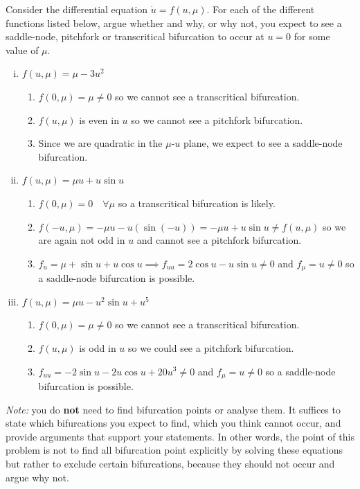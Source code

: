 \documentclass[12pt]{article}
\begin{document}
Consider the differential equation $\dot{u}=f(u,\mu)$. For each of the different functions listed below, argue whether and why, or why not, you expect to see a saddle-node, pitchfork or transcritical bifurcation to occur at $u=0$ for some value of $\mu$.
\begin{enumerate}[(i)]
    \item $f(u,\mu) = \mu-3u^2$

          \color{blue}
          \begin{enumerate}
              \item  $f(0, \mu) = \mu \neq 0$ so we cannot see a transcritical bifurcation.
              \item $f(u, \mu)$ is even in $u$ so we cannot see a pitchfork bifurcation.
              \item Since we are quadratic in the $\mu$-$u$ plane, we expect to see a saddle-node bifurcation.
          \end{enumerate}
          \color{black}

    \item $f(u,\mu) = \mu u+u\sin u$

          \color{blue}
          \begin{enumerate}
              \item   $f(0, \mu) = 0 \quad \forall \mu$ so a transcritical bifurcation is likely.
              \item $f(-u, \mu) = -\mu u - u(\sin(-u)) = -\mu u + u \sin u \neq f(u, \mu)$ so we are again not odd in $u$ and cannot see a pitchfork bifurcation.
              \item $f_u = \mu + \sin u + u\cos u \implies f_{uu} = 2\cos u - u \sin u \neq 0$ and $f_{\mu} = u \neq 0$ so a saddle-node bifurcation is possible.
          \end{enumerate}
          \color{black}

    \item $f(u,\mu) = \mu u - u^2\sin u + u^5$

          \color{blue}
          \begin{enumerate}
              \item $f(0, \mu) = \mu \neq 0$ so we cannot see a transcritical bifurcation.
              \item $f(u, \mu)$ is odd in $u$ so we could see a pitchfork bifurcation.
              \item $f_{uu} = -2\sin u - 2u\cos u + 20u^3 \neq 0$ and $f_{\mu} = u \neq 0$ so a saddle-node bifurcation is possible.
          \end{enumerate}
          \color{black}

\end{enumerate}
\emph{Note:} you do \textbf{not} need to find bifurcation points or analyse them. It suffices to state which bifurcations you expect to find, which you think cannot occur, and provide arguments that support your statements. In other words, the point of this problem is not to find all bifurcation point explicitly by solving these equations but rather to exclude certain bifurcations, because they should not occur and argue why not.
\end{document}

